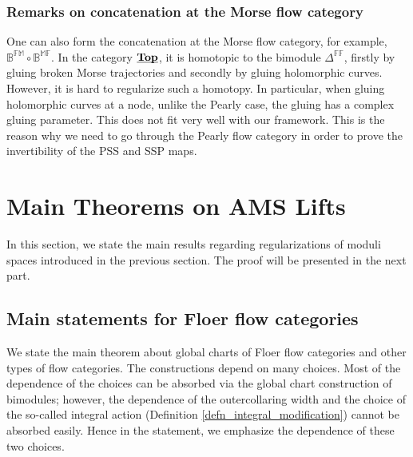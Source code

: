 \documentclass[reqno, 10pt]{amsart}
\numberwithin{equation}{section}
\numberwithin{equation}{section}
\theoremstyle{definition}
\theoremstyle{remark}
\newcommand{\mb}{\mathbb}
\newcommand{\uds}[1]{\underline{\smash{#1}}}
\begin{document}
\subsubsection{Remarks on concatenation at the Morse flow category}\label{subsubsec:remark}

One can also form the concatenation at the Morse flow category, for example, $\mb{B}^{\mb{FM}} \circ\mb{B}^{\mb{MF}}$. In the category $\uds{\bf Top}$, it is homotopic to the bimodule $\mb{\Delta}^{\mb{FF}}$, firstly by gluing broken Morse trajectories and secondly by gluing holomorphic curves. However, it is hard to regularize such a homotopy. In particular, when gluing holomorphic curves at a node, unlike the Pearly case, the gluing has a complex gluing parameter. This does not fit very well with our framework. This is the reason why we need to go through the Pearly flow category in order to prove the invertibility of the PSS and SSP maps. 
















\section{Main Theorems on AMS Lifts}

In this section, we state the main results regarding regularizations of moduli spaces introduced in the previous section. The proof will be presented in the next part.

\subsection{Main statements for Floer flow categories}

We state the main theorem about global charts of Floer flow categories and other types of flow categories. The constructions depend on many choices. Most of the dependence of the choices can be absorbed via the global chart construction of bimodules; however, the dependence of the outercollaring width and the choice of the so-called integral action (Definition \ref{defn_integral_modification}) cannot be absorbed easily. Hence in the statement, we emphasize the dependence of these two choices.
\end{document}
